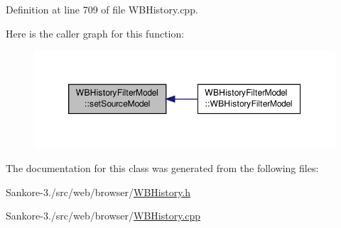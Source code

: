 Definition at line 709 of file W\-B\-History.\-cpp.



Here is the caller graph for this function\-:
\nopagebreak
\begin{figure}[H]
\begin{center}
\leavevmode
\includegraphics[width=350pt]{df/d23/class_w_b_history_filter_model_ae6fb2fe854b960e0a8bca4ab23d5e9e5_icgraph}
\end{center}
\end{figure}




The documentation for this class was generated from the following files\-:\begin{DoxyCompactItemize}
\item 
Sankore-\/3./src/web/browser/\hyperlink{_w_b_history_8h}{W\-B\-History.\-h}\item 
Sankore-\/3./src/web/browser/\hyperlink{_w_b_history_8cpp}{W\-B\-History.\-cpp}\end{DoxyCompactItemize}
